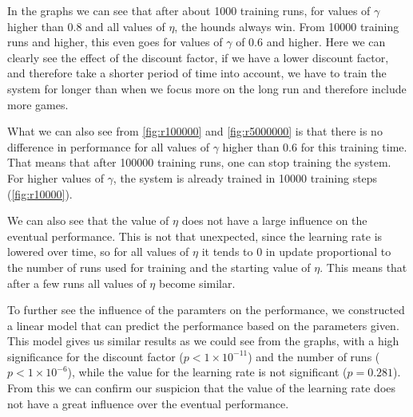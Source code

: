 In the graphs we can see that after about 1000 training runs, for values of
$\gamma$ higher than $0.8$ and all values of $\eta$, the hounds always win.
From 10000 training runs and higher, this even goes for values of $\gamma$
of $0.6$ and higher. Here we can clearly see the effect of the discount
factor, if we have a lower discount factor, and therefore take a shorter
period of time into account, we have to train the system for longer than
when we focus more on the long run and therefore include more games.

What we can also see from \autoref{fig:r100000} and \autoref{fig:r5000000}
is that there is no difference in performance for all values of $\gamma$
higher than $0.6$ for this training time. That means that after 100000
training runs, one can stop training the system. For higher values of
$\gamma$, the system is already trained in 10000 training steps
(\autoref{fig:r10000}).

We can also see that the value of $\eta$ does not have a large influence on
the eventual performance. This is not that unexpected, since the learning
rate is lowered over time, so for all values of $\eta$ it tends to 0 in
update proportional to the number of runs used for training and the
starting value of $\eta$. This means that after a few runs all values of
$\eta$ become similar.

To further see the influence of the paramters on the performance, we
constructed a linear model that can predict the performance based on the
parameters given. This model gives us similar results as we could see from
the graphs, with a high significance for the discount factor ($p < 1 \times
10 ^ {-11}$) and the number of runs ($p < 1 \times 10 ^ {-6}$), while the
value for the learning rate is not significant ($p = 0.281$). From this we
can confirm our suspicion that the value of the learning rate does not have a
great influence over the eventual performance.


